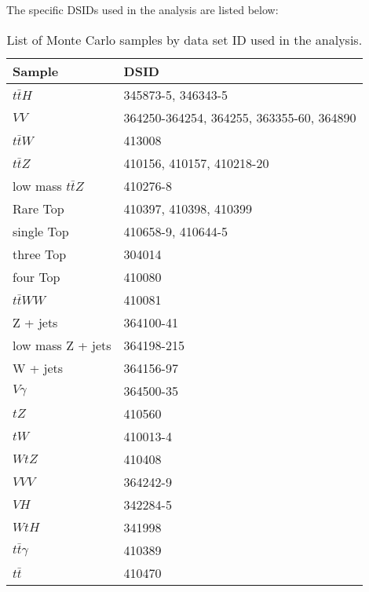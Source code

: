 The specific DSIDs used in the analysis are listed below:

\begin{table}[H]
    \centering
    \begin{tabular}{l|l}
        \hline\hline
        Sample & DSID \\
        \hline\hline
        $t\bar{t}H$ & 345873-5, 346343-5 \\ 
        $VV$ & 364250-364254, 364255, 363355-60, 364890 \\
        $t\bar{t}W$ & 413008 \\
        $t\bar{t}Z$ & 410156, 410157, 410218-20 \\
        low mass $t\bar{t}Z$ & 410276-8 \\
        Rare Top & 410397, 410398, 410399 \\
        single Top & 410658-9, 410644-5 \\
        three Top & 304014 \\
        four Top & 410080 \\
        $t\bar{t}WW$ & 410081 \\
        Z + jets & 364100-41 \\
        low mass Z + jets & 364198-215 \\
        W + jets & 364156-97 \\
        $V\gamma$ & 364500-35 \\
        $tZ$  & 410560 \\
        $tW$  & 410013-4 \\
        $WtZ$ & 410408 \\
        $VVV$ & 364242-9 \\
        $VH$ & 342284-5 \\
        $WtH$ & 341998 \\
        $t\bar{t}\gamma$ & 410389 \\
        $t\bar{t}$ & 410470 \\
        \hline\hline
    \end{tabular}
    \caption{List of Monte Carlo samples by data set ID used in the analysis.}
    \label{tbl:dsids}
\end{table}
